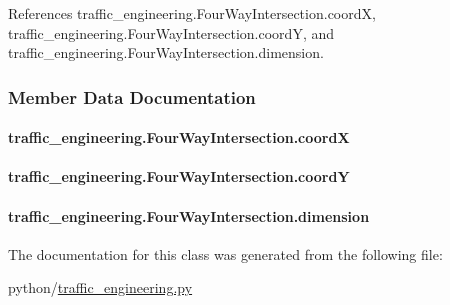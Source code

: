 References traffic\-\_\-engineering.\-Four\-Way\-Intersection.\-coord\-X, traffic\-\_\-engineering.\-Four\-Way\-Intersection.\-coord\-Y, and traffic\-\_\-engineering.\-Four\-Way\-Intersection.\-dimension.



\subsubsection{Member Data Documentation}
\hypertarget{classtraffic__engineering_1_1FourWayIntersection_a787284cf8c1dfa72c3ca408c0b467d9c}{
\paragraph[{coord\-X}]{\setlength{\rightskip}{0pt plus 5cm}traffic\-\_\-engineering.\-Four\-Way\-Intersection.\-coord\-X}}\label{classtraffic__engineering_1_1FourWayIntersection_a787284cf8c1dfa72c3ca408c0b467d9c}
\hypertarget{classtraffic__engineering_1_1FourWayIntersection_a0b85dbf962f6d0ed264c33826be93888}{
\paragraph[{coord\-Y}]{\setlength{\rightskip}{0pt plus 5cm}traffic\-\_\-engineering.\-Four\-Way\-Intersection.\-coord\-Y}}\label{classtraffic__engineering_1_1FourWayIntersection_a0b85dbf962f6d0ed264c33826be93888}
\hypertarget{classtraffic__engineering_1_1FourWayIntersection_a1eda03581ffad141eca9e1cea631ba6f}{
\paragraph[{dimension}]{\setlength{\rightskip}{0pt plus 5cm}traffic\-\_\-engineering.\-Four\-Way\-Intersection.\-dimension}}\label{classtraffic__engineering_1_1FourWayIntersection_a1eda03581ffad141eca9e1cea631ba6f}


The documentation for this class was generated from the following file\-:\begin{DoxyCompactItemize}
\item 
python/\hyperlink{traffic__engineering_8py}{traffic\-\_\-engineering.\-py}\end{DoxyCompactItemize}

